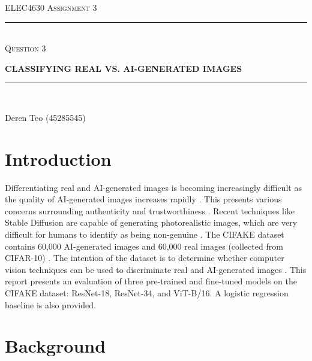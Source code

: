 \begin{titlepage}
  \centering

  \textsc{ELEC4630 Assignment 3}\\
  \vspace{9cm}

  \rule{\linewidth}{0.5pt}\\

  \vspace{1em}
  \LARGE\textsc{Question 3}\\
  \vspace{1em}

  \LARGE\uppercase{\textbf{{Classifying Real vs. AI-Generated Images}}}\\

  \rule{\linewidth}{2pt}\\

  \vfill

  \normalsize{Deren Teo (45285545)}
  \vspace{1cm}

\end{titlepage}

\section{Introduction}

Differentiating real and AI-generated images is becoming increasingly difficult as the quality of AI-generated images increases rapidly \cite{elec4630_2023}. This presents various concerns surrounding authenticity and trustworthiness \cite{elec4630_2023}. Recent techniques like Stable Diffusion are capable of generating photorealistic images, which are very difficult for humans to identify as being non-genuine \cite{bird_2023}. The CIFAKE dataset contains 60,000 AI-generated images and 60,000 real images (collected from CIFAR-10) \cite{bird_2023}. The intention of the dataset is to determine whether computer vision techniques can be used to discriminate real and AI-generated images \cite{bird_2023}. This report presents an evaluation of three pre-trained and fine-tuned models on the CIFAKE dataset: ResNet-18, ResNet-34, and ViT-B/16. A logistic regression baseline is also provided.

\section{Background}
